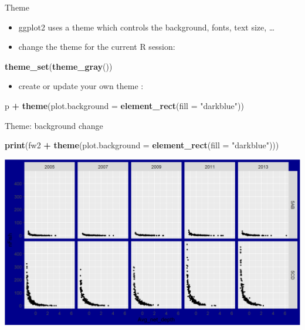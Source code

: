 \documentclass[
  ignorenonframetext,
]{beamer}
\newenvironment{Shaded}{\begin{snugshade}}{\end{snugshade}}
\newcommand{\DataTypeTok}[1]{\textcolor[rgb]{0.13,0.29,0.53}{#1}}
\newcommand{\KeywordTok}[1]{\textcolor[rgb]{0.13,0.29,0.53}{\textbf{#1}}}
\newcommand{\NormalTok}[1]{#1}
\newcommand{\OperatorTok}[1]{\textcolor[rgb]{0.81,0.36,0.00}{\textbf{#1}}}
\newcommand{\StringTok}[1]{\textcolor[rgb]{0.31,0.60,0.02}{#1}}
\providecommand{\tightlist}{%
  \setlength{\itemsep}{0pt}\setlength{\parskip}{0pt}}
\begin{document}
\begin{frame}[fragile]{Theme}
\protect\hypertarget{theme}{}

\begin{itemize}
\tightlist
\item
  ggplot2 uses a theme which controls the background, fonts, text size,
  \ldots{}
\item
  change the theme for the current R session:
\end{itemize}

\begin{Shaded}
\begin{Highlighting}[]
\KeywordTok{theme_set}\NormalTok{(}\KeywordTok{theme_gray}\NormalTok{())}
\end{Highlighting}
\end{Shaded}

\begin{itemize}
\tightlist
\item
  create or update your own theme :
\end{itemize}

\begin{Shaded}
\begin{Highlighting}[]
\NormalTok{p }\OperatorTok{+}\StringTok{ }\KeywordTok{theme}\NormalTok{(}\DataTypeTok{plot.background =} \KeywordTok{element_rect}\NormalTok{(}\DataTypeTok{fill =} \StringTok{"darkblue"}\NormalTok{))}
\end{Highlighting}
\end{Shaded}

\end{frame}

\begin{frame}[fragile]{Theme: background change}
\protect\hypertarget{theme-background-change}{}

\begin{Shaded}
\begin{Highlighting}[]
\KeywordTok{print}\NormalTok{(fw2 }\OperatorTok{+}\StringTok{ }
\StringTok{        }\KeywordTok{theme}\NormalTok{(}\DataTypeTok{plot.background =} \KeywordTok{element_rect}\NormalTok{(}\DataTypeTok{fill =} \StringTok{"darkblue"}\NormalTok{)))}
\end{Highlighting}
\end{Shaded}

\begin{center}\includegraphics[width=0.8\linewidth]{figure/theme_1-1} \end{center}

\end{frame}
\end{document}
